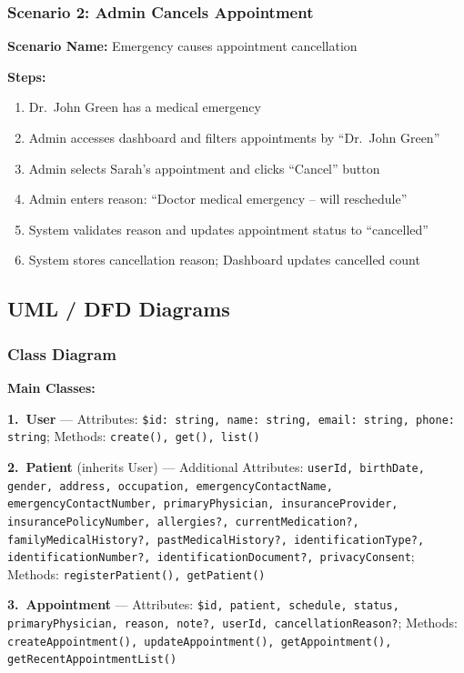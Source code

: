 \documentclass[11pt,a4paper]{article}
\begin{document}
\subsubsection{Scenario 2: Admin Cancels Appointment}

\textbf{Scenario Name:} Emergency causes appointment cancellation

\textbf{Steps:}
\begin{enumerate}
    \item Dr.\ John Green has a medical emergency
    \item Admin accesses dashboard and filters appointments by ``Dr.\ John Green''
    \item Admin selects Sarah's appointment and clicks ``Cancel'' button
    \item Admin enters reason: ``Doctor medical emergency -- will reschedule''
    \item System validates reason and updates appointment status to ``cancelled''
    \item System stores cancellation reason; Dashboard updates cancelled count
\end{enumerate}

\subsection{UML / DFD Diagrams}

\subsubsection{Class Diagram}

\textbf{Main Classes:}

\textbf{1.\ User} --- Attributes: \texttt{\$id: string, name: string, email: string, phone: string}; Methods: \texttt{create(), get(), list()}

\textbf{2.\ Patient} (inherits User) --- Additional Attributes: \texttt{userId, birthDate, gender, address, occupation, emergencyContactName, emergencyContactNumber, primaryPhysician, insuranceProvider, insurancePolicyNumber, allergies?, currentMedication?, familyMedicalHistory?, pastMedicalHistory?, identificationType?, identificationNumber?, identificationDocument?, privacyConsent}; Methods: \texttt{registerPatient(), getPatient()}

\textbf{3.\ Appointment} --- Attributes: \texttt{\$id, patient, schedule, status, primaryPhysician, reason, note?, userId, cancellationReason?}; Methods: \texttt{createAppointment(), updateAppointment(), getAppointment(), getRecentAppointmentList()}
\end{document}
